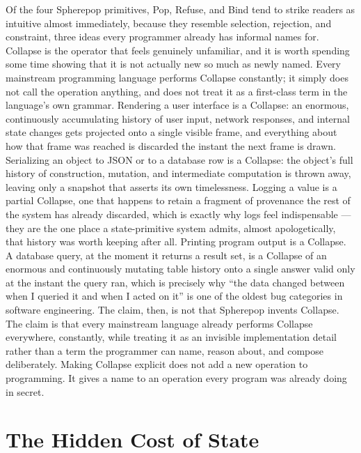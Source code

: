 \documentclass[11pt]{article}
\begin{document}
Of the four Spherepop primitives, Pop, Refuse, and Bind tend to strike readers as intuitive almost immediately, because they resemble selection, rejection, and constraint, three ideas every programmer already has informal names for. Collapse is the operator that feels genuinely unfamiliar, and it is worth spending some time showing that it is not actually new so much as newly named. Every mainstream programming language performs Collapse constantly; it simply does not call the operation anything, and does not treat it as a first-class term in the language's own grammar. Rendering a user interface is a Collapse: an enormous, continuously accumulating history of user input, network responses, and internal state changes gets projected onto a single visible frame, and everything about how that frame was reached is discarded the instant the next frame is drawn. Serializing an object to JSON or to a database row is a Collapse: the object's full history of construction, mutation, and intermediate computation is thrown away, leaving only a snapshot that asserts its own timelessness. Logging a value is a partial Collapse, one that happens to retain a fragment of provenance the rest of the system has already discarded, which is exactly why logs feel indispensable --- they are the one place a state-primitive system admits, almost apologetically, that history was worth keeping after all. Printing program output is a Collapse. A database query, at the moment it returns a result set, is a Collapse of an enormous and continuously mutating table history onto a single answer valid only at the instant the query ran, which is precisely why ``the data changed between when I queried it and when I acted on it'' is one of the oldest bug categories in software engineering. The claim, then, is not that Spherepop invents Collapse. The claim is that every mainstream language already performs Collapse everywhere, constantly, while treating it as an invisible implementation detail rather than a term the programmer can name, reason about, and compose deliberately. Making Collapse explicit does not add a new operation to programming. It gives a name to an operation every program was already doing in secret.

\section{The Hidden Cost of State}
\end{document}
